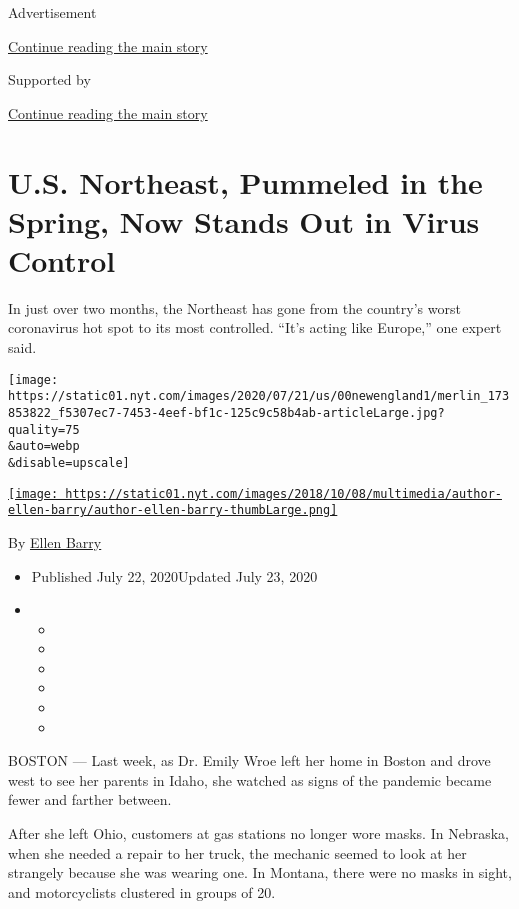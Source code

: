 Advertisement

\protect\hyperlink{after-top}{Continue reading the main story}

Supported by

\protect\hyperlink{after-sponsor}{Continue reading the main story}

\hypertarget{us-northeast-pummeled-in-the-spring-now-stands-out-in-virus-control}{%
\section{U.S. Northeast, Pummeled in the Spring, Now Stands Out in Virus
Control}\label{us-northeast-pummeled-in-the-spring-now-stands-out-in-virus-control}}

In just over two months, the Northeast has gone from the country's worst
coronavirus hot spot to its most controlled. ``It's acting like
Europe,'' one expert said.

\texttt{[image: https://static01.nyt.com/images/2020/07/21/us/00newengland1/merlin\_173853822\_f5307ec7-7453-4eef-bf1c-125c9c58b4ab-articleLarge.jpg?quality=75\\\&auto=webp\\\&disable=upscale]}

\href{https://www.nytimes.com/by/ellen-barry}{\texttt{[image: https://static01.nyt.com/images/2018/10/08/multimedia/author-ellen-barry/author-ellen-barry-thumbLarge.png]}}

By \href{https://www.nytimes.com/by/ellen-barry}{Ellen Barry}

\begin{itemize}
\item
  Published July 22, 2020Updated July 23, 2020
\item
  \begin{itemize}
  \item
  \item
  \item
  \item
  \item
  \item
  \end{itemize}
\end{itemize}

BOSTON --- Last week, as Dr. Emily Wroe left her home in Boston and
drove west to see her parents in Idaho, she watched as signs of the
pandemic became fewer and farther between.

After she left Ohio, customers at gas stations no longer wore masks. In
Nebraska, when she needed a repair to her truck, the mechanic seemed to
look at her strangely because she was wearing one. In Montana, there
were no masks in sight, and motorcyclists clustered in groups of 20.

